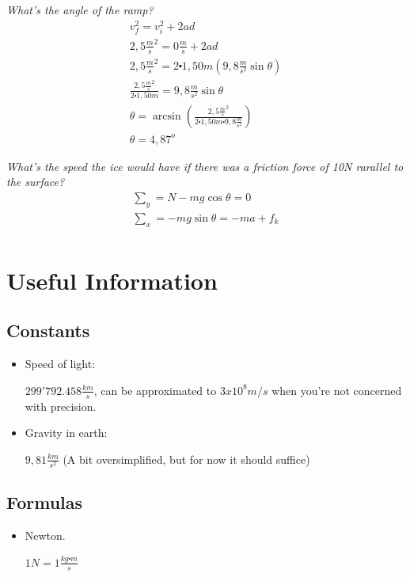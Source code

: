\documentclass[11pt,fleqn]{book} %
\begin{document}
\textit{What's the angle of the ramp?}
\begin{gather}
    v_f^2 = v_i^2 + 2ad\\
    2,5 \frac{m}{s}^2 = 0 \frac{m}{s} + 2ad\\
    2,5 \frac{m}{s}^2 = 2 \centerdot 1,50 m (9,8 \frac{m}{s^2} \sin \theta)\\
    \frac{2,5 \frac{m}{s}^2}{2 \centerdot 1,50 m} = 9,8 \frac{m}{s^2} \sin \theta\\
    \theta = \arcsin{(\frac{2,5 \frac{m}{s}^2}{2 \centerdot 1,50 m \centerdot 9,8 \frac{m}{s^2}})}\\
    \theta = 4,87^o
\end{gather}


\textit{What's the speed the ice would have if there was a friction force of 10N rarallel to the surface?}
\begin{gather}
    \sum_{y} = N - mg \cos \theta = 0\\
    \sum_{x} = -mg \sin \theta = -ma + f_k\\
\end{gather}

\chapter{Useful Information}

\section{Constants}
\begin{itemize}

    \item Speed of light: 
    
    $299'792.458 \frac{km}{s}$, can be approximated to $ 3x10^8 m/s $ when you're not concerned with precision.

    \item Gravity in earth: 
    
    $ 9,81 \frac{km}{s^2}$ (A bit oversimplified, but for now it should suffice)

\end{itemize}
\section{Formulas}
\begin{itemize}
    \item Newton.
    
    $ 1N = 1 \frac{kg \centerdot m}{s} $
\end{itemize}
\end{document}
